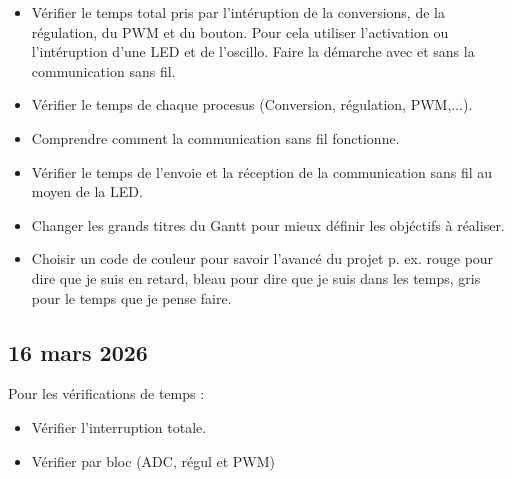 \begin{itemize}
    \item Vérifier le temps total pris par l'intéruption de la conversions, de la régulation, du PWM et du bouton. Pour cela utiliser l'activation ou l'intéruption d'une LED et de l'oscillo. Faire la démarche avec et sans la communication sans fil.

    \item Vérifier le temps de chaque procesus (Conversion, régulation, PWM,...).

    \item Comprendre comment la communication sans fil fonctionne.

    \item Vérifier le temps de l'envoie et la réception de la communication sans fil au moyen de la LED.

    \item Changer les grands titres du Gantt pour mieux définir les objéctifs à réaliser.
    \item Choisir un code de couleur pour savoir l'avancé du projet p. ex. rouge pour dire que je suis en retard, bleau pour dire que je suis dans les temps, gris pour le temps que je pense faire.
\end{itemize}

\subsection*{16 mars 2026}
Pour les vérifications de temps :
\begin{itemize}
    \item Vérifier l'interruption totale.
    \item Vérifier par bloc (ADC, régul et PWM)
\end{itemize}



